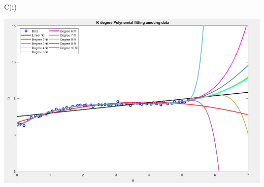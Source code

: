 \documentclass{report}
\begin{document}
\clearpage
\noindent C)i)
\begin{tcolorbox} 
\begin{center}
\includegraphics[width=\textwidth] {LSQ_SVD_Graph.png}
\end{center}
\end{tcolorbox}
\end{document}
